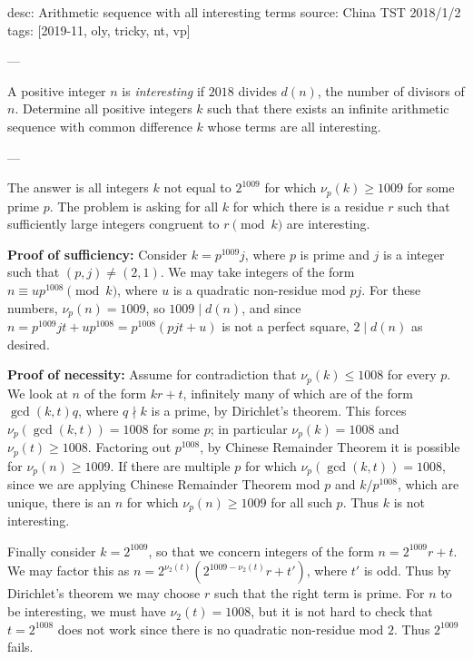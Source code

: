 desc: Arithmetic sequence with all interesting terms
source: China TST 2018/1/2
tags: [2019-11, oly, tricky, nt, vp]

---

A positive integer $n$ is \emph{interesting} if $2018$ divides $d(n)$, the number of divisors of $n$. Determine all positive integers $k$ such that there exists an infinite arithmetic sequence with common difference $k$ whose terms are all interesting.

---

The answer is all integers $k$ not equal to $2^{1009}$ for which $\nu_p(k)\ge1009$ for some prime $p$. The problem is asking for all $k$ for which there is a residue $r$ such that sufficiently large integers congruent to $r\pmod k$ are interesting.

\bigskip

\textbf{Proof of sufficiency:}     Consider $k=p^{1009}j$, where $p$ is prime and $j$ is a integer such that $(p,j)\ne(2,1)$. We may take integers of the form $n\equiv up^{1008}\pmod{k}$, where $u$ is a quadratic non-residue mod $pj$. For these numbers, $\nu_p(n)=1009$, so $1009\mid d(n)$, and since $n=p^{1009}jt+up^{1008}=p^{1008}(pjt+u)$ is not a perfect square, $2\mid d(n)$ as desired.

\bigskip

\textbf{Proof of necessity:}     Assume for contradiction that $\nu_p(k)\le1008$ for every $p$. We look at $n$ of the form $kr+t$, infinitely many of which are of the form $\gcd(k,t)q$, where $q\nmid k$ is a prime, by Dirichlet's theorem. This forces $\nu_p(\gcd(k,t))=1008$ for some $p$; in particular $\nu_p(k)=1008$ and $\nu_p(t)\ge1008$. Factoring out $p^{1008}$, by Chinese Remainder Theorem it is possible for $\nu_p(n)\ge1009$. If there are multiple $p$ for which $\nu_p(\gcd(k,t))=1008$, since we are applying Chinese Remainder Theorem mod $p$ and $k/p^{1008}$, which are unique, there is an $n$ for which $\nu_p(n)\ge1009$ for all such $p$. Thus $k$ is not interesting.

Finally consider $k=2^{1009}$, so that we concern integers of the form $n=2^{1009}r+t$. We may factor this as $n=2^{\nu_2(t)}(2^{1009-\nu_2(t)}r+t')$, where $t'$ is odd. Thus by Dirichlet's theorem we may choose $r$ such that the right term is prime. For $n$ to be interesting, we must have $\nu_2(t)=1008$, but it is not hard to check that $t=2^{1008}$ does not work since there is no quadratic non-residue mod $2$. Thus $2^{1009}$ fails.

